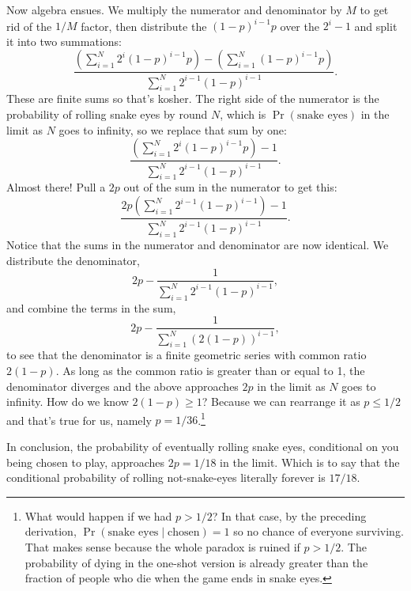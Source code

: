 \documentclass[article,twocolumn]{memoir}
\begin{document}
Now algebra ensues.
We multiply the numerator and denominator by $M$ to get rid of the $1/M$ factor, 
then distribute the $(1-p)^{i-1}p$ over the $2^i-1$ and split it into two summations:
$$\dfrac{
\left(\sum\limits_{i=1}^{N}2^i(1-p)^{i-1}p\right) -
\left(\sum\limits_{i=1}^{N}(1-p)^{i-1}p \right)
}{\sum\limits_{i=1}^{N} 2^{i-1}(1-p)^{i-1}}.
$$
These are finite sums so that's kosher.
The right side of the numerator is the probability of rolling snake eyes by round $N$, which is $\Pr(\text{snake eyes})$ in the limit as $N$ goes to infinity, so we replace that sum by one:
$$\dfrac{
\left(\sum\limits_{i=1}^{N}2^i(1-p)^{i-1}p\right) - 1
}{\sum\limits_{i=1}^{N}2^{i-1}(1-p)^{i-1}}.
$$
Almost there!
Pull a $2p$ out of the sum in the numerator to get this:
$$\dfrac{
2p\left(\sum\limits_{i=1}^{N}2^{i-1}(1-p)^{i-1}\right) - 1
}{\sum\limits_{i=1}^{N}2^{i-1}(1-p)^{i-1}}.
$$
Notice that the sums in the numerator and denominator are now identical.
We distribute the denominator,
$$2p - \dfrac{1} 
{\sum\limits_{i=1}^{N}2^{i-1}(1-p)^{i-1}},
$$
and combine the terms in the sum,
$$2p - \dfrac{1} 
{\sum\limits_{i=1}^{N}\left(2(1-p)\right)^{i-1}},
$$
to see that the denominator is a finite geometric series with common ratio $2(1-p)$.
As long as the common ratio is greater than or equal to 1, 
the denominator diverges and the above approaches $2p$ in the limit as $N$ goes to infinity.
How do we know $2(1-p) \geq 1$?
Because we can rearrange it as $p\leq 1/2$ and that's true for us, namely $p=1/36$.\footnote{
What would happen if we had $p>1/2$?
In that case, by the preceding derivation, $\Pr(\text{snake eyes} \mid \text{chosen}) = 1$ so no chance of everyone surviving.
That makes sense because the whole paradox is ruined if $p>1/2$.
The probability of dying in the one-shot version is already greater than the fraction of people who die when the game ends in snake eyes.}

In conclusion, the probability of eventually rolling snake eyes, conditional on you being chosen to play, approaches $2p=1/18$ in the limit.
Which is to say that the conditional probability of rolling not-snake-eyes literally forever is $17/18$.
\end{document}
